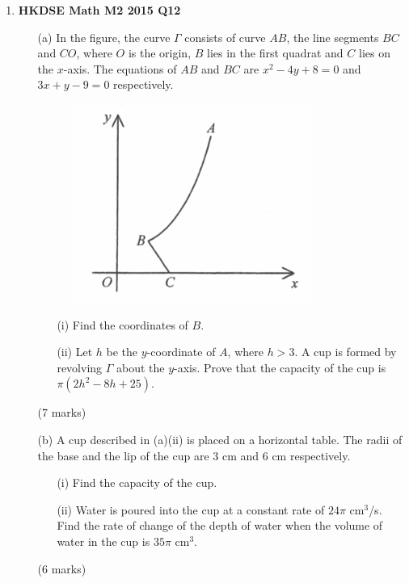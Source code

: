 \documentclass{report}
\begin{document}
\begin{enumerate}
	\item \textbf{HKDSE Math M2 2015 Q12}
	\begin{enumerate}
		\item [(a)]In the figure, the curve $\Gamma$ consists of curve $AB$, the line segments $BC$ and $CO$, where $O$ is the origin, $B$ lies in the first quadrat and $C$ lies on the $x$-axis. The equations of $AB$ and $BC$ are $x^2-4y+8 = 0$ and $3x+y-9=0$ respectively.
			\begin{figure}[H]
				\centering
				\includegraphics[width = .5\linewidth]{2015Figure1}
			\end{figure}
		\begin{enumerate}
			\item [(i)]Find the coordinates of $B$. 
			\item [(ii)]Let $h$ be the $y$-coordinate of $A$, where $h > 3$. A cup is formed by revolving $\Gamma$ about the $y$-axis. Prove that the capacity of the cup is $\pi(2h^2-8h+25)$.
		\end{enumerate}
		(7 marks)
		\item [(b)]A cup described in (a)(ii) is placed on a horizontal table. The radii of the base and the lip of the cup are 3 cm and 6 cm respectively.
		\begin{enumerate}
			\item [(i)]Find the capacity of the cup.
			\item [(ii)]Water is poured into the cup at a constant rate of $24\pi$ cm$^3$/s. Find the rate of change of the depth of water when the volume of water in the cup is $35\pi$ cm$^3$.
		\end{enumerate}
		(6 marks)
	\end{enumerate}
\end{enumerate}
\end{document}
